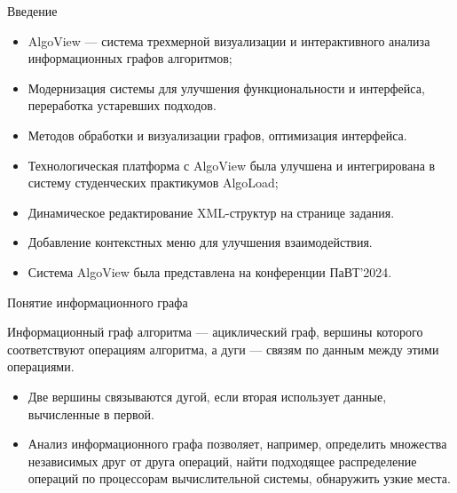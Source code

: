 \begin{frame}{Введение}
\begin{itemize}

    \item AlgoView — система трехмерной визуализации и интерактивного анализа информационных графов алгоритмов;
    \item Модернизация системы для улучшения функциональности и интерфейса, переработка устаревших подходов.
    \item Методов обработки и визуализации графов, оптимизация интерфейса.
    \item Технологическая платформа с AlgoView была улучшена и интегрирована в систему студенческих практикумов AlgoLoad;
    \item Динамическое редактирование XML-структур на странице задания.
    \item Добавление контекстных меню для улучшения взаимодействия.
    \item Система AlgoView была представлена на конференции ПаВТ'2024.
    
\end{itemize}
\end{frame}


\begin{frame}{Понятие информационного графа}

Информационный граф алгоритма — ациклический граф, вершины которого соответствуют операциям алгоритма, а дуги — связям по данным между этими операциями.  
 
\begin{itemize}
    \item Две вершины связываются дугой, если вторая использует данные, вычисленные в первой.
    \item Анализ информационного графа позволяет, например, определить множества независимых друг от друга операций, найти подходящее распределение операций по процессорам вычислительной системы, обнаружить узкие места.
\end{itemize}






    
\end{frame}

